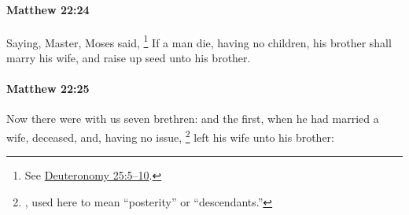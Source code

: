		\paragraph{Matthew 22:24} %
			\label{MATTHEW-22-24}

			Saying, Master, Moses said,%
				\footnote{%
					See \hyperref[DEUTERONOMY-25-5]{Deuteronomy 25:5--10}.
					}
			If a man die, having no children, his brother shall marry his wife, and raise up seed unto his brother.

			\begin{framed}
			\scriptsize
				\begin{compactdesc}
					\item[SBLG] 
				\end{compactdesc}
			\end{framed}

		\paragraph{Matthew 22:25} %
			\label{MATTHEW-22-25}

			Now there were with us seven brethren: and the first, when he had married a wife, deceased, and, having no issue,%
				\footnote{%
					, used here to mean ``posterity'' or ``descendants.''
					}
			left his wife unto his brother:


